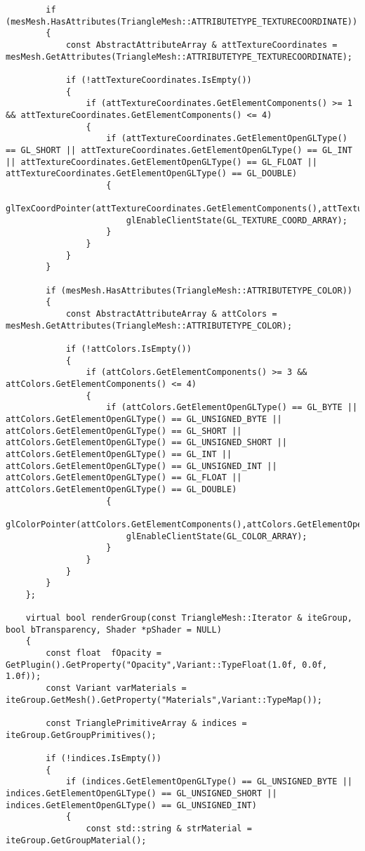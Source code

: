 \begin{verbatim}
		if (mesMesh.HasAttributes(TriangleMesh::ATTRIBUTETYPE_TEXTURECOORDINATE))
		{
			const AbstractAttributeArray & attTextureCoordinates = mesMesh.GetAttributes(TriangleMesh::ATTRIBUTETYPE_TEXTURECOORDINATE);

			if (!attTextureCoordinates.IsEmpty())
			{
				if (attTextureCoordinates.GetElementComponents() >= 1 && attTextureCoordinates.GetElementComponents() <= 4)
				{
					if (attTextureCoordinates.GetElementOpenGLType() == GL_SHORT || attTextureCoordinates.GetElementOpenGLType() == GL_INT || attTextureCoordinates.GetElementOpenGLType() == GL_FLOAT || attTextureCoordinates.GetElementOpenGLType() == GL_DOUBLE)
					{
						glTexCoordPointer(attTextureCoordinates.GetElementComponents(),attTextureCoordinates.GetElementOpenGLType(),0,attTextureCoordinates.Get());
						glEnableClientState(GL_TEXTURE_COORD_ARRAY);
					}
				}
			}
		}

		if (mesMesh.HasAttributes(TriangleMesh::ATTRIBUTETYPE_COLOR))
		{
			const AbstractAttributeArray & attColors = mesMesh.GetAttributes(TriangleMesh::ATTRIBUTETYPE_COLOR);

			if (!attColors.IsEmpty())
			{
				if (attColors.GetElementComponents() >= 3 && attColors.GetElementComponents() <= 4)
				{
					if (attColors.GetElementOpenGLType() == GL_BYTE || attColors.GetElementOpenGLType() == GL_UNSIGNED_BYTE || attColors.GetElementOpenGLType() == GL_SHORT || attColors.GetElementOpenGLType() == GL_UNSIGNED_SHORT || attColors.GetElementOpenGLType() == GL_INT || attColors.GetElementOpenGLType() == GL_UNSIGNED_INT || attColors.GetElementOpenGLType() == GL_FLOAT || attColors.GetElementOpenGLType() == GL_DOUBLE)
					{
						glColorPointer(attColors.GetElementComponents(),attColors.GetElementOpenGLType(),0,attColors.Get());
						glEnableClientState(GL_COLOR_ARRAY);
					}
				}
			}
		}
	};

	virtual bool renderGroup(const TriangleMesh::Iterator & iteGroup, bool bTransparency, Shader *pShader = NULL)
	{
		const float  fOpacity = GetPlugin().GetProperty("Opacity",Variant::TypeFloat(1.0f, 0.0f, 1.0f));
		const Variant varMaterials = iteGroup.GetMesh().GetProperty("Materials",Variant::TypeMap());

		const TrianglePrimitiveArray & indices = iteGroup.GetGroupPrimitives();

		if (!indices.IsEmpty())
		{
			if (indices.GetElementOpenGLType() == GL_UNSIGNED_BYTE || indices.GetElementOpenGLType() == GL_UNSIGNED_SHORT || indices.GetElementOpenGLType() == GL_UNSIGNED_INT)
			{
				const std::string & strMaterial = iteGroup.GetGroupMaterial();


\end{verbatim}
